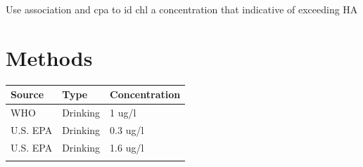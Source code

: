 \documentclass[11pt,]{article}
\begin{document}
Use association and cpa to id chl a concentration that indicative of
exceeding HA

\section{Methods}\label{methods}

\begin{longtable}[c]{@{}lll@{}}
\toprule
\begin{minipage}[b]{0.11\columnwidth}\raggedright\strut
Source
\strut\end{minipage} &
\begin{minipage}[b]{0.16\columnwidth}\raggedright\strut
Type
\strut\end{minipage} &
\begin{minipage}[b]{0.19\columnwidth}\raggedright\strut
Concentration
\strut\end{minipage}\tabularnewline
\midrule
\endhead
\begin{minipage}[t]{0.11\columnwidth}\raggedright\strut
WHO
\strut\end{minipage} &
\begin{minipage}[t]{0.16\columnwidth}\raggedright\strut
Drinking
\strut\end{minipage} &
\begin{minipage}[t]{0.19\columnwidth}\raggedright\strut
1 ug/l
\strut\end{minipage}\tabularnewline
\begin{minipage}[t]{0.11\columnwidth}\raggedright\strut
U.S. EPA
\strut\end{minipage} &
\begin{minipage}[t]{0.16\columnwidth}\raggedright\strut
Drinking
\strut\end{minipage} &
\begin{minipage}[t]{0.19\columnwidth}\raggedright\strut
0.3 ug/l
\strut\end{minipage}\tabularnewline
\begin{minipage}[t]{0.11\columnwidth}\raggedright\strut
U.S. EPA
\strut\end{minipage} &
\begin{minipage}[t]{0.16\columnwidth}\raggedright\strut
Drinking
\strut\end{minipage} &
\begin{minipage}[t]{0.19\columnwidth}\raggedright\strut
1.6 ug/l
\strut\end{minipage}\tabularnewline
\begin{minipage}[t]{0.11\columnwidth}\raggedright\strut

\end{minipage}
\end{longtable}
\end{document}
